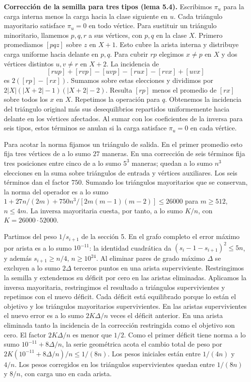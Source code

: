 \documentclass[spanish,11pt,a4paper]{article}
\begin{document}
\textbf{Corrección de la semilla para tres tipos (lema 5.4).} Escribimos \(\pi_u\) para la carga interna menos la carga hacia la clase siguiente en \(u\). Cada triángulo mayoritario satisface \(\pi_u=0\) en todo vértice. Para sustituir un triángulo minoritario, llamemos \(p,q,r\) a sus vértices, con \(p,q\) en la clase \(X\). Primero promediamos \([pqz]\) sobre \(z\) en \(X+1\). Esto cubre la arista interna y distribuye carga uniforme hacia delante en \(p,q\). Para cubrir \(rp\) elegimos \(x\ne p\) en \(X\) y dos vértices distintos \(u,v\ne r\) en \(X+2\). La incidencia de \[[rup]+[rvp]-[uvp]-[rux]-[rvx]+[uvx]\] es \(2([rp]-[rx])\). Sumamos sobre estas elecciones y dividimos por \(2|X|(|X+2|-1)(|X+2|-2)\). Resulta \([rp]\) menos el promedio de \([rx]\) sobre todos los \(x\) en \(X\). Repetimos la operación para \(q\). Obtenemos la incidencia del triángulo original más sus desequilibrios repartidos uniformemente hacia delante en los vértices afectados. Al sumar con los coeficientes de la inversa para seis tipos, estos términos se anulan si la carga satisface \(\pi_u=0\) en cada vértice.

Para acotar la norma fijamos un triángulo de salida. En el primer promedio esto fija tres vértices de a lo sumo \(27\) maneras. En una corrección de seis términos fija tres posiciones entre cinco de a lo sumo \(5^3\) maneras; quedan a lo sumo \(n^3\) elecciones en la suma sobre triángulos de entrada y vértices auxiliares. Los seis términos dan el factor \(750\). Sumando los triángulos mayoritarios que se conservan, la norma del operador es a lo sumo \(1+27n/(2m)+750n^3/[2m(m-1)(m-2)]\le26000\) para \(m\ge512\), \(n\le4m\). La inversa mayoritaria cuesta, por tanto, a lo sumo \(K/n\), con \(K=26000\cdot52000\).

Partimos del peso \(1/s_{i+1}\) de la sección 5. En el grafo completo el error máximo por arista es a lo sumo \(10^{-11}\): la identidad cuadrática da \((s_i-1-s_{i+1})^2\le5n\), y además \(s_{i+1}\ge n/4\), \(n\ge10^{24}\). Al eliminar pares de grado máximo \(\Delta\) se excluyen a lo sumo \(2\Delta\) terceros puntos en una arista superviviente. Restringimos la semilla y extendemos su déficit por cero en las aristas eliminadas. Aplicamos la inversa mayoritaria, restringimos el resultado a triángulos supervivientes y repetimos con el nuevo déficit. Cada déficit está equilibrado porque lo están el objetivo y los triángulos mayoritarios supervivientes. En las aristas supervivientes el nuevo error es a lo sumo \(2K\Delta/n\) veces el déficit anterior. En una arista eliminada tanto la incidencia de la corrección restringida como el objetivo son cero. El factor \(2K\Delta/n\) es menor que \(1/2\). Como el primer déficit tiene norma a lo sumo \(10^{-11}+8\Delta/n\), la serie geométrica acota el cambio total de peso por \(2K(10^{-11}+8\Delta/n)/n\le1/(8n)\). Los pesos iniciales están entre \(1/(4n)\) y \(4/n\). Los pesos corregidos en los triángulos supervivientes quedan entre \(1/(8n)\) y \(8/n\), con carga uno en cada arista.
\end{document}
